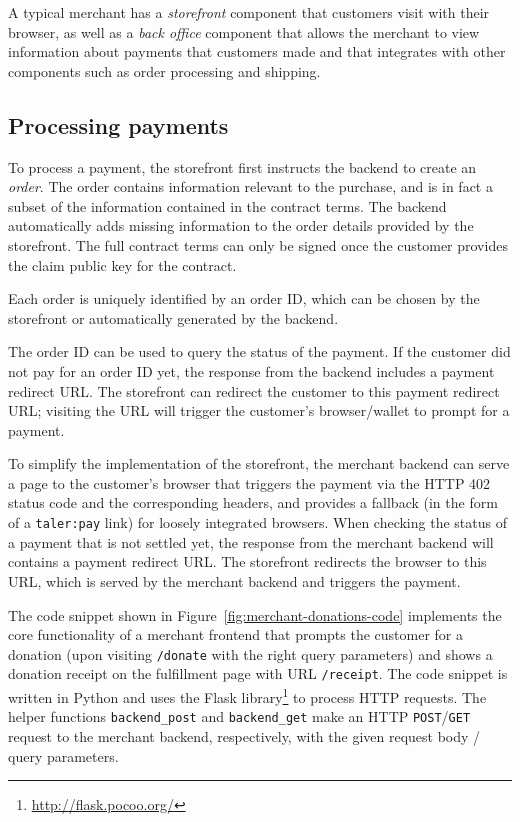 A typical merchant has a \emph{storefront} component that customers visit with
their browser, as well as a \emph{back office} component that allows the
merchant to view information about payments that customers made and that integrates
with other components such as order processing and shipping.

\subsection{Processing payments}\label{sec:processing-payments}

To process a payment, the storefront first instructs the backend to create an
\emph{order}.  The order contains information relevant to the purchase, and is
in fact a subset of the information contained in the contract terms.  The
backend automatically adds missing information to the order details provided by
the storefront.  The full contract terms can only be signed once the customer
provides the claim public key for the contract.

Each order is uniquely identified by an order ID, which can be chosen by the
storefront or automatically generated by the backend.

The order ID can be used to query the status of the payment.  If the customer
did not pay for an order ID yet, the response from the backend includes a
payment redirect URL.  The storefront can redirect the customer to this
payment redirect URL; visiting the URL will trigger the customer's
browser/wallet to prompt for a payment.

To simplify the implementation of the storefront, the merchant backend can
serve a page to the customer's browser that triggers the payment via the HTTP
402 status code and the corresponding headers, and provides a fallback (in the
form of a \texttt{taler:pay} link) for loosely integrated browsers.
When checking the status of a payment that is not settled yet, the response from the merchant backend
will contains a payment redirect URL.  The storefront redirects the browser to this URL,
which is served by the merchant backend and triggers the payment.

The code snippet shown in Figure~\ref{fig:merchant-donations-code} implements
the core functionality of a merchant frontend that prompts the customer for a
donation (upon visiting \texttt{/donate} with the right query parameters) and
shows a donation receipt on the fulfillment page with URL \texttt{/receipt}.
The code snippet is written in Python and uses the Flask library\footnote{\url{http://flask.pocoo.org/}} to process HTTP requests.
The helper functions \texttt{backend\_post}
and \texttt{backend\_get} make an HTTP \texttt{POST}/\texttt{GET} request to the merchant backend, respectively,
with the given request body / query parameters.

